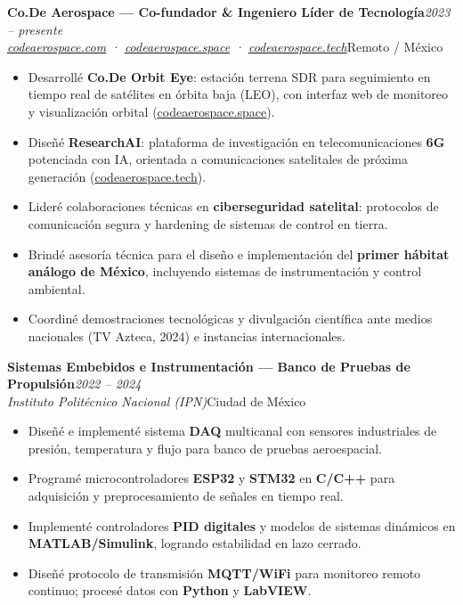 \documentclass[10pt, letterpaper]{article}
\newcommand{\cventry}[4]{%
  \vspace{2pt}%
  {\color{azuloscuro}\textbf{#1}}\hfill{\small\color{gristexto}\textit{#2}}\\[-3pt]
  {\small\color{azulmedio}\textit{#3}}\hfill{\small\color{gristexto}#4}%
  \vspace{1pt}%
}
\begin{document}
\cventry{Co.De Aerospace — Co-fundador \& Ingeniero Líder de Tecnología}{2023 – presente}{\href{https://codeaerospace.com}{codeaerospace.com} · \href{https://codeaerospace.space}{codeaerospace.space} · \href{https://codeaerospace.tech}{codeaerospace.tech}}{Remoto / México}
\begin{itemize}
  \item Desarrollé \textbf{Co.De Orbit Eye}: estación terrena SDR para seguimiento en tiempo real de satélites en órbita baja (LEO), con interfaz web de monitoreo y visualización orbital (\href{https://codeaerospace.space}{codeaerospace.space}).
  \item Diseñé \textbf{ResearchAI}: plataforma de investigación en telecomunicaciones \textbf{6G} potenciada con IA, orientada a comunicaciones satelitales de próxima generación (\href{https://codeaerospace.tech}{codeaerospace.tech}).
  \item Lideré colaboraciones técnicas en \textbf{ciberseguridad satelital}: protocolos de comunicación segura y hardening de sistemas de control en tierra.
  \item Brindé asesoría técnica para el diseño e implementación del \textbf{primer hábitat análogo de México}, incluyendo sistemas de instrumentación y control ambiental.
  \item Coordiné demostraciones tecnológicas y divulgación científica ante medios nacionales (TV Azteca, 2024) e instancias internacionales.
\end{itemize}

\vspace{2pt}

\cventry{Sistemas Embebidos e Instrumentación — Banco de Pruebas de Propulsión}{2022 – 2024}{Instituto Politécnico Nacional (IPN)}{Ciudad de México}
\begin{itemize}
  \item Diseñé e implementé sistema \textbf{DAQ} multicanal con sensores industriales de presión, temperatura y flujo para banco de pruebas aeroespacial.
  \item Programé microcontroladores \textbf{ESP32} y \textbf{STM32} en \textbf{C/C++} para adquisición y preprocesamiento de señales en tiempo real.
  \item Implementé controladores \textbf{PID digitales} y modelos de sistemas dinámicos en \textbf{MATLAB/Simulink}, logrando estabilidad en lazo cerrado.
  \item Diseñé protocolo de transmisión \textbf{MQTT/WiFi} para monitoreo remoto continuo; procesé datos con \textbf{Python} y \textbf{LabVIEW}.
\end{itemize}
\end{document}
